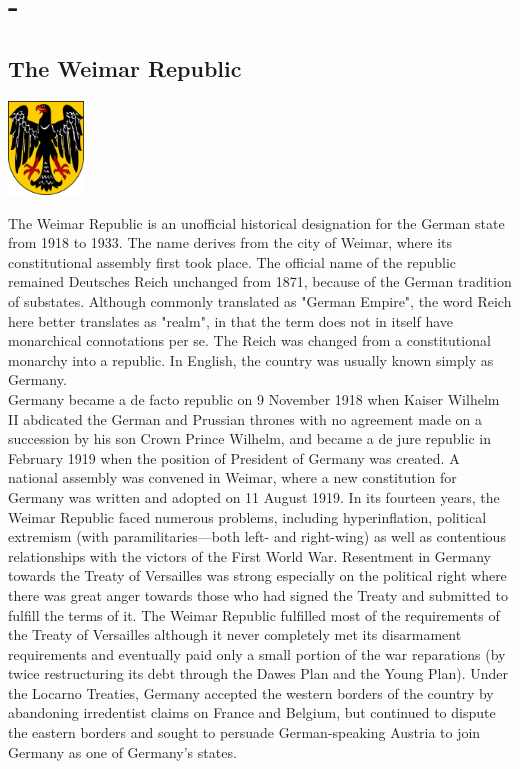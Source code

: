 \documentclass[11pt]{report}
\begin{document}
\section{-}
\subsection{The Weimar Republic}
\vspace{2mm}\begin{center}\includegraphics[width=2cm]{./img/weimarRepublic.jpg}\end{center}
The Weimar Republic is an unofficial historical designation for the German state from 1918 to 1933. The name derives from the city of Weimar, where its constitutional assembly first took place. The official name of the republic remained Deutsches Reich unchanged from 1871, because of the German tradition of substates. Although commonly translated as "German Empire", the word Reich here better translates as "realm", in that the term does not in itself have monarchical connotations per se. The Reich was changed from a constitutional monarchy into a republic. In English, the country was usually known simply as Germany.\\ \indent Germany became a de facto republic on 9 November 1918 when Kaiser Wilhelm II abdicated the German and Prussian thrones with no agreement made on a succession by his son Crown Prince Wilhelm, and became a de jure republic in February 1919 when the position of President of Germany was created. A national assembly was convened in Weimar, where a new constitution for Germany was written and adopted on 11 August 1919. In its fourteen years, the Weimar Republic faced numerous problems, including hyperinflation, political extremism (with paramilitaries—both left- and right-wing) as well as contentious relationships with the victors of the First World War. Resentment in Germany towards the Treaty of Versailles was strong especially on the political right where there was great anger towards those who had signed the Treaty and submitted to fulfill the terms of it. The Weimar Republic fulfilled most of the requirements of the Treaty of Versailles although it never completely met its disarmament requirements and eventually paid only a small portion of the war reparations (by twice restructuring its debt through the Dawes Plan and the Young Plan). Under the Locarno Treaties, Germany accepted the western borders of the country by abandoning irredentist claims on France and Belgium, but continued to dispute the eastern borders and sought to persuade German-speaking Austria to join Germany as one of Germany's states.
\end{document}
